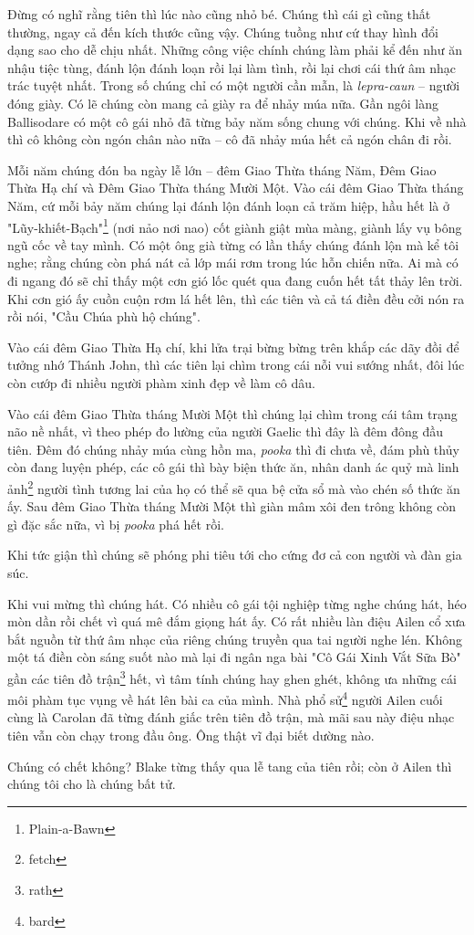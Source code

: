 Đừng có nghĩ rằng tiên thì lúc nào cũng nhỏ bé. Chúng thì cái gì cũng thất thường, ngay cả đến kích thước cũng vậy. Chúng tuồng như cứ thay hình đổi dạng sao cho dễ chịu nhất. Những công việc chính chúng làm phải kể đến như ăn nhậu tiệc tùng, đánh lộn đánh loạn rồi lại làm tình, rồi lại chơi cái thứ âm nhạc trác tuyệt nhất. Trong số chúng chỉ có một người cần mẫn, là \textit{lepra-caun} – người đóng giày. Có lẽ chúng còn mang cả giày ra để nhảy múa nữa. Gần ngôi làng Ballisodare có một cô gái nhỏ đã từng bảy năm sống chung với chúng. Khi về nhà thì cô không còn ngón chân nào nữa – cô đã nhảy múa hết cả ngón chân đi rồi.

Mỗi năm chúng đón ba ngày lễ lớn – đêm Giao Thừa tháng Năm, Đêm Giao Thừa Hạ chí và Đêm Giao Thừa tháng Mười Một. Vào cái đêm Giao Thừa tháng Năm, cứ mỗi bảy năm chúng lại đánh lộn đánh loạn cả trăm hiệp, hầu hết là ở "Lũy-khiết-Bạch"\footnote{Plain-a-Bawn} (nơi nảo nơi nao) cốt giành giật mùa màng, giành lấy vụ bông ngũ cốc về tay mình. Có một ông già từng có lần thấy chúng đánh lộn mà kể tôi nghe; rằng chúng còn phá nát cả lớp mái rơm trong lúc hỗn chiến nữa. Ai mà có đi ngang đó sẽ chỉ thấy một cơn gió lốc quét qua đang cuốn hết tất thảy lên trời. Khi cơn gió ấy cuồn cuộn rơm lá hết lên, thì các tiên và cả tá điền đều cởi nón ra rồi nói, "Cầu Chúa phù hộ chúng".

Vào cái đêm Giao Thừa Hạ chí, khi lửa trại bừng bừng trên khắp các dãy đồi để tưởng nhớ Thánh John, thì các tiên lại chìm trong cái nỗi vui sướng nhất, đôi lúc còn cướp đi nhiều người phàm xinh đẹp về làm cô dâu.

Vào cái đêm Giao Thừa tháng Mười Một thì chúng lại chìm trong cái tâm trạng não nề nhất, vì theo phép đo lường của người Gaelic thì đây là đêm đông đầu tiên. Đêm đó chúng nhảy múa cùng hồn ma, \textit{pooka} thì đi chưa về, đám phù thủy còn đang luyện phép, các cô gái thì bày biện thức ăn, nhân danh ác quỷ mà linh ảnh\footnote{fetch} người tình tương lai của họ có thể sẽ qua bệ cửa sổ mà vào chén số thức ăn ấy. Sau đêm Giao Thừa tháng Mười Một thì giàn mâm xôi đen trông không còn gì đặc sắc nữa, vì bị \textit{pooka} phá hết rồi.

Khi tức giận thì chúng sẽ phóng phi tiêu tới cho cứng đơ cả con người và đàn gia súc.

Khi vui mừng thì chúng hát. Có nhiều cô gái tội nghiệp từng nghe chúng hát, héo mòn dần rồi chết vì quá mê đắm giọng hát ấy. Có rất nhiều làn điệu Ailen cổ xưa bắt nguồn từ thứ âm nhạc của riêng chúng truyền qua tai người nghe lén. Không một tá điền còn sáng suốt nào mà lại đi ngân nga bài "Cô Gái Xinh Vắt Sữa Bò" gần các tiên đồ trận\footnote{rath} hết, vì tâm tính chúng hay ghen ghét, không ưa những cái môi phàm tục vụng về hát lên bài ca của mình. Nhà phổ sử\footnote{bard} người Ailen cuối cùng là Carolan đã từng đánh giấc trên tiên đồ trận, mà mãi sau này điệu nhạc tiên vẫn còn chạy trong đầu ông. Ông thật vĩ đại biết dường nào.

Chúng có chết không? Blake từng thấy qua lễ tang của tiên rồi; còn ở Ailen thì chúng tôi cho là chúng bất tử.

